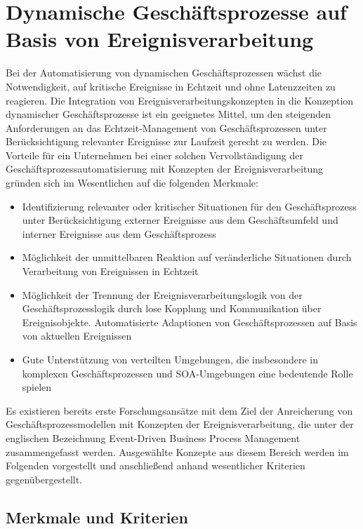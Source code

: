 \section{Dynamische Geschäftsprozesse auf Basis von Ereignisverarbeitung}\label{sec:Kombi}
Bei der Automatisierung von dynamischen Geschäftsprozessen wächst die Notwendigkeit, auf kritische Ereignisse in Echtzeit und ohne Latenzzeiten zu reagieren. 
Die Integration von Ereignisverarbeitungskonzepten in die Konzeption dynamischer Geschäftsprozesse ist ein geeignetes Mittel, um den steigenden Anforderungen an das Echtzeit-Management von Geschäftsprozessen unter Berücksichtigung relevanter Ereignisse zur Laufzeit gerecht zu werden. 
\cite{Abolhassan.2016}
Die Vorteile für ein Unternehmen bei einer solchen Vervollständigung der Geschäftsprozessautomatisierung mit Konzepten der Ereignisverarbeitung gründen sich im Wesentlichen auf die folgenden Merkmale:

\begin{itemize}
    \item 
    Identifizierung relevanter oder kritischer Situationen für den Geschäftsprozess unter Berücksichtigung externer Ereignisse aus dem Geschäftsumfeld und interner Ereignisse aus dem Geschäftsprozess
    \item 
    Möglichkeit der unmittelbaren Reaktion auf veränderliche Situationen durch Verarbeitung von Ereignissen in Echtzeit
    \item
    Möglichkeit der Trennung der Ereignisverarbeitungslogik von der Geschäftsprozesslogik durch lose Kopplung und Kommunikation über Ereignisobjekte. Automatisierte Adaptionen von Geschäftsprozessen auf Basis von aktuellen Ereignissen
    \item
    Gute Unterstützung von verteilten Umgebungen, die insbesondere in komplexen Geschäftsprozessen und \ac{SOA}-Umgebungen eine bedeutende Rolle spielen
\end{itemize}

Es existieren bereits erste Forschungsansätze mit dem Ziel der Anreicherung von Geschäftsprozessmodellen mit Konzepten der Ereignisverarbeitung, die unter der englischen Bezeichnung Event-Driven Business Process Management zusammengefasst werden. Ausgewählte Konzepte aus diesem Bereich werden im Folgenden vorgestellt und anschließend anhand wesentlicher Kriterien gegenübergestellt.

\subsection{Merkmale und Kriterien}

